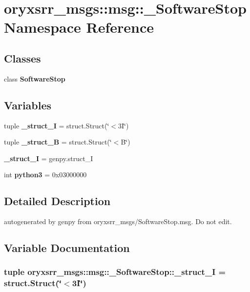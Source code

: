 \section{oryxsrr\-\_\-msgs\-:\-:msg\-:\-:\-\_\-\-Software\-Stop \-Namespace \-Reference}
\label{namespaceoryxsrr__msgs_1_1msg_1_1__SoftwareStop}
\subsection*{\-Classes}
\begin{DoxyCompactItemize}
\item 
class {\bf \-Software\-Stop}
\end{DoxyCompactItemize}
\subsection*{\-Variables}
\begin{DoxyCompactItemize}
\item 
tuple {\bf \-\_\-struct\-\_\-I} = struct.\-Struct(\char`\"{}$<$3\-I\char`\"{})
\item 
tuple {\bf \-\_\-struct\-\_\-\-B} = struct.\-Struct(\char`\"{}$<$\-B\char`\"{})
\item 
{\bf \-\_\-struct\-\_\-\-I} = genpy.\-struct\-\_\-\-I
\item 
int {\bf python3} = 0x03000000
\end{DoxyCompactItemize}


\subsection{\-Detailed \-Description}
\begin{DoxyVerb}autogenerated by genpy from oryxsrr_msgs/SoftwareStop.msg. Do not edit.\end{DoxyVerb}
 

\subsection{\-Variable \-Documentation}
\subsubsection[{\-\_\-struct\-\_\-3\-I}]{\setlength{\rightskip}{0pt plus 5cm}tuple {\bf oryxsrr\-\_\-msgs\-::msg\-::\-\_\-\-Software\-Stop\-::\-\_\-struct\-\_\-I} = struct.\-Struct(\char`\"{}$<$3\-I\char`\"{})}\label{namespaceoryxsrr__msgs_1_1msg_1_1__SoftwareStop_a948297410a8dbab871bb3369b420dd12}


